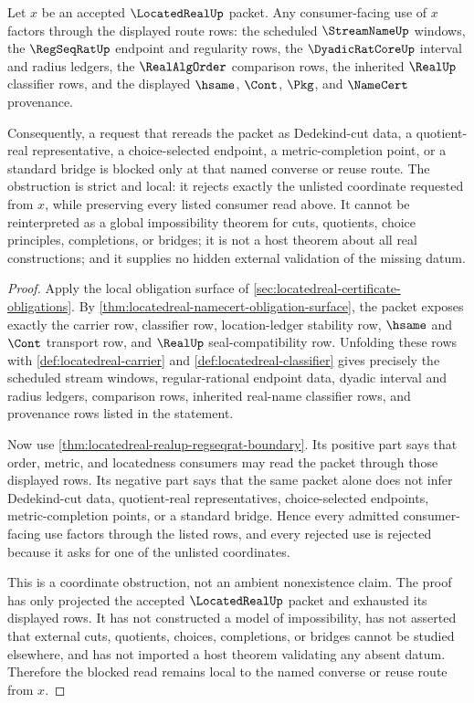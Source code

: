 \begin{corollary}
\label{cor:locatedreal-strict-local-obstruction}
Let $x$ be an accepted $\LocatedRealUp$ packet. Any consumer-facing use of $x$ factors through the displayed route rows: the scheduled $\StreamNameUp$ windows, the $\RegSeqRatUp$ endpoint and regularity rows, the $\DyadicRatCoreUp$ interval and radius ledgers, the $\RealAlgOrder$ comparison rows, the inherited $\RealUp$ classifier rows, and the displayed $\hsame$, $\Cont$, $\Pkg$, and $\NameCert$ provenance.

Consequently, a request that rereads the packet as Dedekind-cut data, a quotient-real representative, a choice-selected endpoint, a metric-completion point, or a standard bridge is blocked only at that named converse or reuse route. The obstruction is strict and local: it rejects exactly the unlisted coordinate requested from $x$, while preserving every listed consumer read above. It cannot be reinterpreted as a global impossibility theorem for cuts, quotients, choice principles, completions, or bridges; it is not a host theorem about all real constructions; and it supplies no hidden external validation of the missing datum.
\end{corollary}
\begin{proof}
Apply the local obligation surface of \autoref{sec:locatedreal-certificate-obligations}. By \autoref{thm:locatedreal-namecert-obligation-surface}, the packet exposes exactly the carrier row, classifier row, location-ledger stability row, $\hsame$ and $\Cont$ transport row, and $\RealUp$ seal-compatibility row. Unfolding these rows with \autoref{def:locatedreal-carrier} and \autoref{def:locatedreal-classifier} gives precisely the scheduled stream windows, regular-rational endpoint data, dyadic interval and radius ledgers, comparison rows, inherited real-name classifier rows, and provenance rows listed in the statement.

Now use \autoref{thm:locatedreal-realup-regseqrat-boundary}. Its positive part says that order, metric, and locatedness consumers may read the packet through those displayed rows. Its negative part says that the same packet alone does not infer Dedekind-cut data, quotient-real representatives, choice-selected endpoints, metric-completion points, or a standard bridge. Hence every admitted consumer-facing use factors through the listed rows, and every rejected use is rejected because it asks for one of the unlisted coordinates.

This is a coordinate obstruction, not an ambient nonexistence claim. The proof has only projected the accepted $\LocatedRealUp$ packet and exhausted its displayed rows. It has not constructed a model of impossibility, has not asserted that external cuts, quotients, choices, completions, or bridges cannot be studied elsewhere, and has not imported a host theorem validating any absent datum. Therefore the blocked read remains local to the named converse or reuse route from $x$.
\end{proof}
